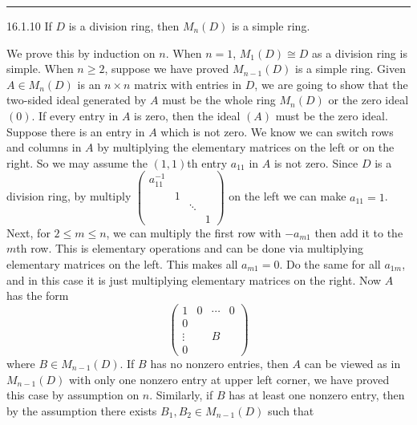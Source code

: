 \documentclass[a4paper, 12pt]{article}
\begin{document}
\noindent\rule{7in}{2.8pt}
\begin{problem}{16.1.10}
If \(D\) is a division ring, then \(M_n(D)\) is a simple ring.
\end{problem}
\begin{solution}
We prove this by induction on \(n\). When \(n=1\), \(M_1(D)\cong D\) as a division ring is simple. When \(n\geq 2\), suppose we have proved \(M_{n-1}(D)\) is a simple ring. Given \(A\in M_n(D)\) is an \(n\times n\) 
matrix with entries in \(D\), we are going to show that the two-sided ideal generated by \(A\) must be the whole ring \(M_n(D)\) or the zero ideal \((0)\). If every entry in \(A\) is zero, then the ideal \((A)\) must be the zero ideal. Suppose there is an entry in \(A\) which is 
not zero. We know we can switch rows and columns in \(A\) by multiplying the elementary matrices on the left or on the right. So we may assume the \((1,1)\)th entry \(a_{11}\) in \(A\) is not zero. Since \(D\) is a division ring, by multiply 
\(\begin{pmatrix}
    a_{11}^{-1}& & & \\
    & 1 & & \\ 
    & & \ddots & \\ 
    & & & 1
\end{pmatrix}\) on the left we can make \(a_{11}=1\). Next, for \(2\leq m\leq n\), we can multiply the first row with \(-a_{m1}\) then add it to the \(m\)th row. This is elementary operations and can be done via multiplying elementary matrices on the left. This makes all 
\(a_{m1}=0\). Do the same for all \(a_{1m}\), and in this case it is just multiplying elementary matrices on the right. Now \(A\) has the form 
\[\begin{pmatrix}
    1 & 0 &\cdots & 0\\ 
    0 &   &       &   \\ 
    \vdots & & B &  \\ 
    0 & & &
\end{pmatrix}\] 
where \(B\in M_{n-1}(D)\). If \(B\) has no nonzero entries, then \(A\) can be viewed as in \(M_{n-1}(D)\) with only one nonzero entry at upper left corner, we have proved this case by assumption on \(n\). Similarly, if \(B\) has at least one nonzero entry, then 
by the assumption there exists \(B_1,B_2\in M_{n-1}(D)\) such that  

\end{solution}
\end{document}
